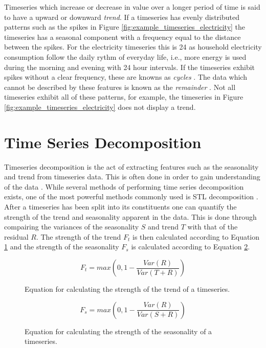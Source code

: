 Timeseries which increase or decrease in value over a longer period of time is said to have a upward or downward \textit{trend}. If a timeseries has evenly distributed patterns such as the spikes in Figure \ref{fig:example_timeseries_electricity} the timeseries has a seasonal component with a frequency equal to the distance between the spikes. For the electricity timeseries this is 24 as household electricity consumption follow the daily rythm of everyday life, i.e., more energy is used during the morning and evening with 24 hour intervals. If the timeseries exhibit spikes without a clear frequency, these are knowns as \textit{cycles} \cite{bauer2021libra}. The data which cannot be described by these features is known as the \textit{remainder} \cite{hyndman_forecasting_3rd}. Not all timeseries exhibit all of these patterns, for example, the timeseries in Figure \ref{fig:example_timeseries_electricity} does not display a trend.

\section{Time Series Decomposition}
\label{sec:time_series_decomposition}
Timeseries decomposition is the act of extracting features such as the seasonality and trend from timeseries data. This is often done in order to gain understanding of the data \cite{hyndman_forecasting_3rd}. While several methods of performing time series decomposition exists, one of the most powerful methods commonly used is STL decomposition \cite{hyndman_forecasting_3rd}. After a timeseries has been split into its constituents one can quantify the strength of the trend and seasonality apparent in the data. This is done through compairing the variances of the seasonality \(S\) and trend \(T\) with that of the residual \(R\). The strength of the trend \(F_t\) is then calculated according to Equation \ref{eq:strength_of_trend} and the strength of the seasonality \(F_s\) is calculated according to Equation \ref{eq:strength_of_seasonality}.

\begin{figure}[h]
  \[ F_t = max(0,1-\frac{Var(R)}{Var(T + R)}) \]
  \caption{Equation for calculating the strength of the trend of a timeseries.}
  \label{eq:strength_of_trend}
\end{figure}

\begin{figure}[h]
  \[ F_s = max(0,1-\frac{Var(R)}{Var(S + R)}) \]
  \caption{Equation for calculating the strength of the seasonality of a timeseries.}
  \label{eq:strength_of_seasonality}
\end{figure}

